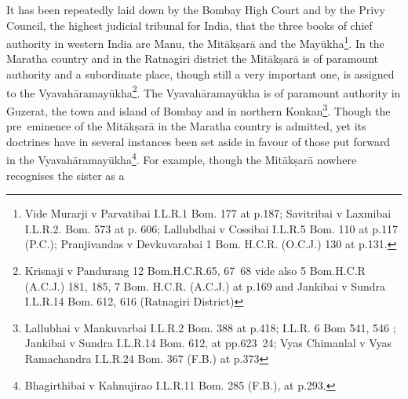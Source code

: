 \documentclass[11pt, openany]{book}
\begin{document}
It has been repeatedly laid down by the Bombay High Court and by the Privy Council, the highest judicial tribunal for India, that the three books of chief authority in western India are Manu, the Mitākṣarā and the Mayūkha\renewcommand{\thefootnote}{1}\footnote{Vide Murarji v Parvatibai I.L.R.1 Bom. 177 at p.187; Savitribai v Laxmibai I.L.R.2. Bom. 573 at p. 606; Lallubdhai v Cossibai I.L.R.5 Bom. 110 at p.117 (P.C.); Pranjivandas v Devkuvarabai 1 Bom. H.C.R. (O.C.J.) 130 at p.131.}. In the Maratha country and in the Ratnagiri district the Mitākṣarā is of paramount authority and a subordinate place, though still a very important one, is assigned to the Vyavahāramayūkha\renewcommand{\thefootnote}{2}\footnote{Krisnaji v Pandurang 12 Bom.H.C.R.65, 67\textendash\ 68 vide also 5 Bom.H.C.R (A.C.J.) 181, 185, 7 Bom. H.C.R. (A.C.J.) at p.169 and Jankibai v Sundra I.L.R.14 Bom. 612, 616 (Ratnagiri District)}. The Vyavahāramayūkha is of paramount authority in Guzerat, the town and island of Bombay and in northern Konkan\renewcommand{\thefootnote}{3}\footnote{Lallubhai v Mankuvarbai I.L.R.2 Bom. 388 at p.418; I.L.R. 6 Bom 541, 546 ; Jankibai v Sundra I.L.R.14 Bom. 612, at pp.623\textendash\ 24; Vyas Chimanlal v Vyas Ramachandra I.L.R.24 Bom. 367 (F.B.) at p.373}. Though the pre\textendash\ eminence of the Mitākṣarā in the Maratha country is admitted, yet its doctrines have in several instances been set aside in favour of those put forward in the Vyavahāramayūkha\renewcommand{\thefootnote}{4}\footnote{Bhagirthibai v Kahnujirao I.L.R.11 Bom. 285 (F.B.), at p.293.}. For example, though the Mitākṣarā nowhere recognises the sister as a

\newpage
\end{document}
